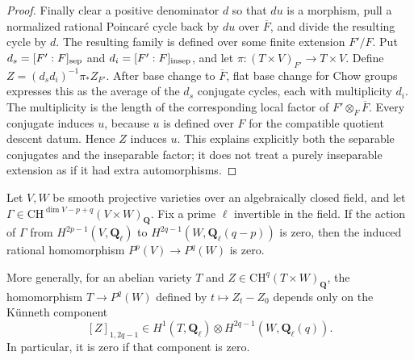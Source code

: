 \begin{proof}
Finally clear a positive denominator $d$ so that $du$ is a morphism,
pull a normalized rational Poincar\'e cycle back by $du$ over
$\overline F$, and divide the resulting cycle by $d$.
The resulting family is defined over some finite
extension $F'/F$.  Put $d_s=[F':F]_{\rm sep}$ and
$d_i=[F':F]_{\rm insep}$, and let
$\pi:(T\times V)_{F'}\to T\times V$.
Define $Z=(d_sd_i)^{-1}\pi_*Z_{F'}$.  After base change to
$\overline F$, flat base change for Chow groups expresses this as
the average of the $d_s$ conjugate cycles, each with multiplicity
$d_i$.  The multiplicity is the length of the corresponding local
factor of $F'\otimes_F\overline F$.  Every conjugate induces $u$,
because $u$ is defined over $F$ for the compatible quotient descent
datum.  Hence $Z$ induces $u$.  This explains explicitly both the
separable conjugates and the inseparable factor; it does not treat a
purely inseparable extension as if it had extra automorphisms.
\end{proof}

\begin{lemma}
\label{jac:P01}
Let $V,W$ be smooth projective varieties over an algebraically closed
field, and let
$\Gamma\in\mathrm{CH}^{\dim V-p+q}(V\times W)_{\mathbf Q}$.
Fix a prime $\ell$ invertible in the field.  If the action of $\Gamma$
from $H^{2p-1}(V,\mathbf Q_\ell)$ to
$H^{2q-1}(W,\mathbf Q_\ell(q-p))$ is zero, then the induced rational
homomorphism $P^p(V)\longrightarrow P^q(W)$ is zero.

More generally, for an abelian variety $T$ and
$Z\in\mathrm{CH}^q(T\times W)_{\mathbf Q}$, the homomorphism
$T\longrightarrow P^q(W)$ defined by $t\mapsto Z_t-Z_0$ depends only
on the K\"unneth component
\[
 [Z]_{1,2q-1}\in H^1(T,\mathbf Q_\ell)\otimes
 H^{2q-1}(W,\mathbf Q_\ell(q)).
\]
In particular, it is zero if that component is zero.
\end{lemma}

